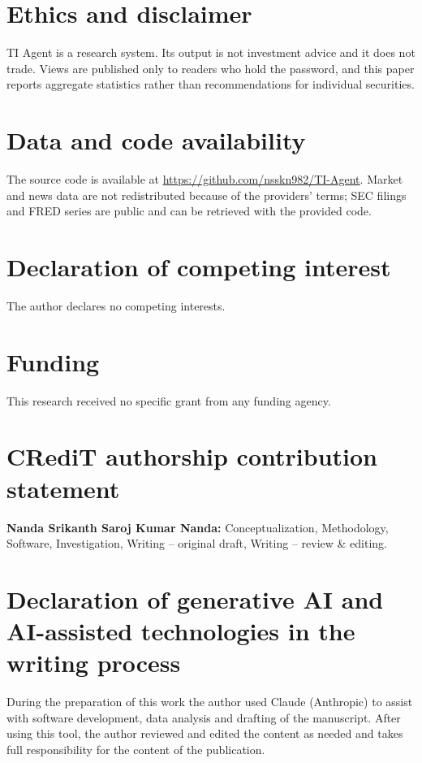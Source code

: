 \documentclass[preprint,11pt]{elsarticle}
\begin{document}
\section*{Ethics and disclaimer}
TI Agent is a research system. Its output is not investment advice and it does not trade. Views are
published only to readers who hold the password, and this paper reports aggregate statistics rather than
recommendations for individual securities.

\section*{Data and code availability}
The source code is available at \url{https://github.com/nsskn982/TI-Agent}. Market and news data are not
redistributed because of the providers' terms; SEC filings and FRED series are public and can be
retrieved with the provided code.

\section*{Declaration of competing interest}
The author declares no competing interests.

\section*{Funding}
This research received no specific grant from any funding agency.

\section*{CRediT authorship contribution statement}
\textbf{Nanda Srikanth Saroj Kumar Nanda:} Conceptualization, Methodology, Software, Investigation, Writing
-- original draft, Writing -- review \& editing.

\section*{Declaration of generative AI and AI-assisted technologies in the writing process}
During the preparation of this work the author used Claude (Anthropic) to assist with software development,
data analysis and drafting of the manuscript. After using this tool, the author reviewed and edited the
content as needed and takes full responsibility for the content of the publication.



\end{document}
